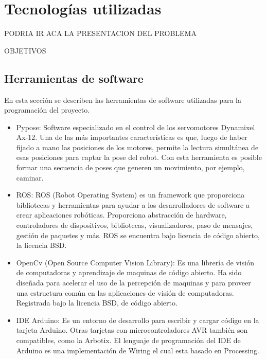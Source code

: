 \chapter{Tecnologías utilizadas}\label{chapter:presentacion_del_problema}

 PODRIA IR ACA LA PRESENTACION DEL PROBLEMA
 
 OBJETIVOS
 
\section{ Herramientas de software}
En esta sección se describen las herramientas de software utilizadas para la programación del proyecto.
\begin{itemize}
\item Pypose: Software especializado en el control de los servomotores Dynamixel Ax-12. Una de las más importantes características es que, luego de haber fijado a mano las posiciones de los motores, permite la lectura simultánea de esas posiciones para captar la pose del robot. Con esta herramienta es posible formar una secuencia de poses que generen un movimiento, por ejemplo, caminar. \cite{pypose}

\item ROS: ROS (Robot Operating System) es un framework que proporciona bibliotecas y herramientas para ayudar a los desarrolladores de software a crear aplicaciones robóticas. Proporciona abstracción de hardware, controladores de dispositivos, bibliotecas, visualizadores, paso de mensajes, gestión de paquetes y más. ROS se encuentra bajo licencia de código abierto, la licencia BSD.

\item OpenCv (Open Source Computer Vision Library): Es una librería de visión de computadoras y aprendizaje de maquinas de código abierto. Ha sido diseñada para acelerar el uso de la percepción de maquinas y para proveer una estructura común en las aplicaciones de visión de computadoras. Registrada bajo la licencia BSD, de código abierto. \cite{opencv}

\item IDE Arduino: Es un entorno de desarrollo para escribir y cargar código en la tarjeta Arduino. Otras tarjetas con microcontroladores AVR también son compatibles, como la Arbotix. El lenguaje de programación del IDE de Arduino es una implementación de Wiring el cual esta basado en Processing.  \cite{arduino}

\end{itemize}


